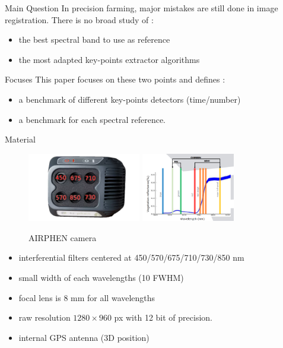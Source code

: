 \documentclass{beamer}
\begin{document}
		\begin{frame}{Main Question}
			In precision farming, major mistakes are still done in image registration.
			There is no broad study of :
			
			\begin{itemize}
				\item the best spectral band to use as reference
				\item the most adapted key-points extractor algorithms
			\end{itemize}
		\end{frame}
	
		\begin{frame}{Focuses}
			This paper focuses on these two points and defines :
			\begin{itemize}
				\item a benchmark of different key-points detectors (time/number)
				\item a benchmark for each spectral reference.
			\end{itemize}
		\end{frame}
	
		\begin{frame}{Material}
			\begin{figure}
				\centering
				\includegraphics[height=3cm]{../figures/airphen-detail4.png}
				\includegraphics[height=3cm]{wavelengths.png}
				\caption{AIRPHEN camera}
			\end{figure}
			\begin{itemize}
				\item interferential filters centered at {\small 450/570/675/710/730/850 nm}
				\item small width of each wavelengths (10 FWHM)
				\item focal lens is 8 mm for all wavelengths
				\item raw resolution $1280 \times 960$ px with 12 bit of precision.
				\item internal GPS antenna (3D position)
			\end{itemize}
		\end{frame}
	
\end{document}

